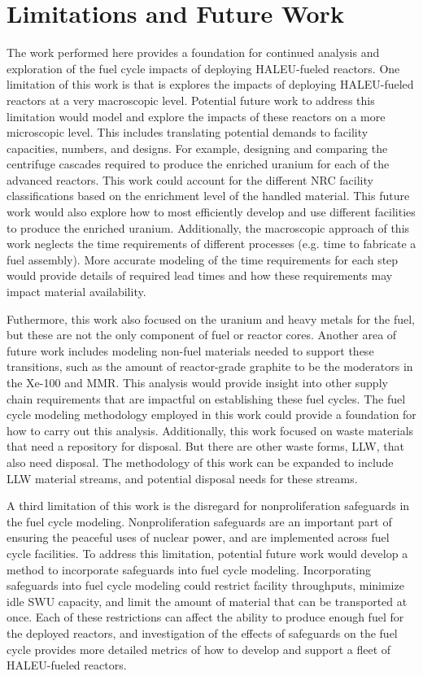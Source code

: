 \section{Limitations and Future Work}
The work performed here provides a foundation for continued analysis and 
exploration of the fuel cycle impacts of deploying \gls{HALEU}-fueled reactors. 
One limitation of this work is that is explores the impacts of 
deploying \gls{HALEU}-fueled reactors at a very macroscopic level. 
Potential future work to address this limitation would model and 
explore the impacts of these reactors on a more microscopic level. 
This includes translating potential demands to facility capacities, 
numbers, and designs. For example, designing and comparing the 
centrifuge cascades required to produce the enriched uranium for 
each of the advanced reactors. This work could account for the 
different \gls{NRC} facility classifications based on the 
enrichment level of the handled material. This future work 
would also explore how to 
most efficiently develop and use different facilities to produce the 
enriched uranium. Additionally,
the macroscopic approach of this work neglects the 
time requirements 
of different processes (e.g. time to fabricate a fuel assembly). 
More accurate modeling of the time requirements for each step would 
provide details of required lead times and how these requirements 
may impact material availability. 

Futhermore, this work also focused on the uranium and heavy metals for 
the fuel, but these are not the only component of fuel or reactor 
cores. Another area of future work includes modeling non-fuel 
materials needed to support these transitions, such as the amount 
of reactor-grade graphite 
to be the moderators in the Xe-100 and \gls{MMR}. This analysis would 
provide insight into other supply chain requirements that are  
impactful on establishing these fuel cycles. The fuel cycle modeling 
methodology employed in this work could provide a foundation 
for how to carry out this analysis. Additionally, this work 
focused on waste materials that need a repository for disposal. 
But there are other waste forms, \acrfull{LLW}, that also need 
disposal. The methodology of this work can be expanded to 
include \gls{LLW} material streams, and potential disposal 
needs for these streams. 

A third limitation of this work is the disregard for nonproliferation 
safeguards in the fuel cycle modeling. Nonproliferation safeguards 
are an important part of ensuring the peaceful uses of nuclear 
power, and are implemented across fuel cycle facilities. To 
address this limitation, potential future work would develop 
a method to incorporate safeguards into fuel cycle modeling. 
Incorporating safeguards into fuel cycle modeling could 
restrict facility throughputs, minimize idle \gls{SWU} 
capacity, and limit the amount of material that can be transported 
at once. Each of these restrictions can affect the ability 
to produce enough fuel for the deployed reactors, and investigation 
of the effects of safeguards on the fuel cycle provides more 
detailed metrics of how to develop and support a fleet of 
\gls{HALEU}-fueled reactors. 


